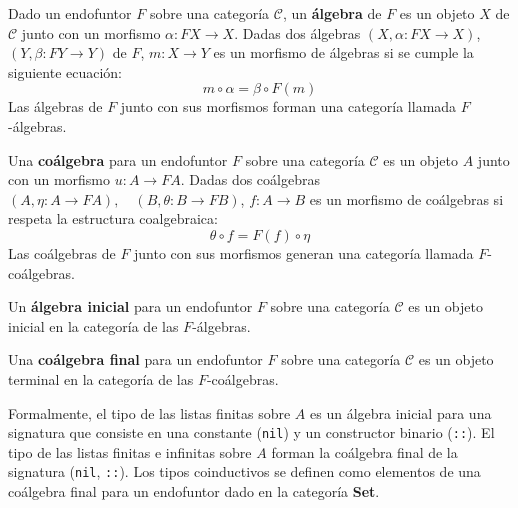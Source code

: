 \begin{definition}
Dado un endofuntor $\mathit{F}$ sobre una categoría $\mathscr{C}$, un \textbf{álgebra} de $\mathit{F}$ es un objeto $X$ de $\mathscr{C}$ junto con un morfismo $\alpha : \mathit{F}X \rightarrow X$. Dadas dos álgebras $(X, \alpha : \mathit{F}X \rightarrow X)$, $(Y, \beta : \mathit{F}Y \rightarrow Y)$ de $F$, $m : X \rightarrow Y$ es un morfismo de álgebras si se cumple la siguiente ecuación:
\begin{equation*}
m \circ \alpha = \beta \circ \mathit{F}(m)
\end{equation*}
Las álgebras de $\mathit{F}$ junto con sus morfismos forman una categoría llamada $\mathit{F}$-álgebras. 
\end{definition}

\begin{definition}
Una \textbf{coálgebra} para un endofuntor $\mathit{F}$ sobre una categoría $\mathscr{C}$ es un objeto $A$ junto con un morfismo $u : A \rightarrow \mathit{F} A$. Dadas dos coálgebras $(A, \eta : A \rightarrow \mathit{F}A), \quad (B, \theta : B \rightarrow \mathit{F}B)$, $f : A \rightarrow B$ es un morfismo de coálgebras si respeta la estructura coalgebraica: 
\begin{equation*}
\theta \circ f = \mathit{F}(f) \circ \eta
\end{equation*} 
Las coálgebras de $\mathit{F}$ junto con sus morfismos generan una categoría llamada $\mathit{F}$-coálgebras.
\end{definition}

\begin{definition}
Un \textbf{álgebra inicial} para un endofuntor $\mathit{F}$ sobre una categoría $\mathscr{C}$ es un objeto inicial en la categoría de las $\mathit{F}$-álgebras.
\end{definition}

\begin{definition}
Una \textbf{coálgebra final} para un endofuntor $\mathit{F}$ sobre una categoría $\mathscr{C}$ es un objeto terminal en la categoría de las $\mathit{F}$-coálgebras. 
\end{definition}

Formalmente, el tipo de las listas finitas sobre $A$ es un álgebra inicial para una signatura que consiste en una constante (\texttt{nil}) y un constructor binario (\texttt{::}). El tipo de las listas finitas e infinitas sobre $A$ forman la coálgebra final de la signatura (\texttt{nil}, \texttt{::}). Los tipos coinductivos se definen como elementos de una coálgebra final para un endofuntor dado en la categoría \textbf{Set}. 

